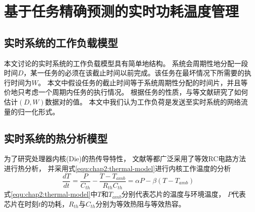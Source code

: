 


\chapter{基于任务精确预测的实时功耗温度管理}
\label{cha:DPTM}

\section{实时系统的工作负载模型}
\label{sec:workload}
本文讨论的实时系统的工作负载模型具有简单地结构。 系统会周期性地分配一段时间$D$，某一任务的必须在该截止时间以前完成。该任务在最坏情况下所需要的执行时间为$W$。 本文中假设任务的截止时间等于系统周期性分配的时间片，并且等价地只考虑一个周期内任务的执行情况。 根据任务的性质，与等文献研究了如何估计$(D,W)$数据对的值。
本文中我们认为工作负荷是发送至实时系统的网络流量的归一化形式。


\section{实时系统的热分析模型}
\label{sec:thermal}
为了研究处理器内核(Die)的热传导特性， 文献等都广泛采用了等效RC电路方法进行热分析， 并采用式\ref{equ:chap2:thermal-model}进行内核工作温度的分析
\begin{equation}
\label{equ:chap2:thermal-model}
\frac{dT}{dt} = \frac{P}{C_{th}}-\frac{T-T_{amb}}{R_{th}C_{th}} = \alpha P -\beta (T-T_{amb})
\end{equation}
式\ref{equ:chap2:thermal-model}中$T$和$T_{amb}$分别代表芯片的温度与环境温度， $P$代表芯片在时刻$t$的功耗，$R_{th}$与$C_{th}$分别为等效热阻与等效热容。


